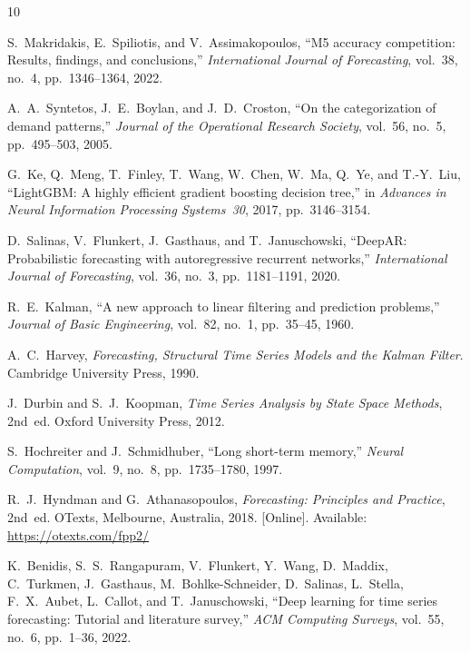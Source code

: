 \documentclass[conference]{IEEEtran}
\begin{document}
\begin{thebibliography}{10}

S.~Makridakis, E.~Spiliotis, and V.~Assimakopoulos,
``M5 accuracy competition: Results, findings, and conclusions,''
\textit{International Journal of Forecasting}, vol.~38, no.~4, pp.~1346--1364, 2022.

A.~A.~Syntetos, J.~E.~Boylan, and J.~D.~Croston,
``On the categorization of demand patterns,''
\textit{Journal of the Operational Research Society}, vol.~56, no.~5, pp.~495--503, 2005.

G.~Ke, Q.~Meng, T.~Finley, T.~Wang, W.~Chen, W.~Ma, Q.~Ye, and T.-Y.~Liu,
``LightGBM: A highly efficient gradient boosting decision tree,''
in \textit{Advances in Neural Information Processing Systems~30}, 2017, pp.~3146--3154.

D.~Salinas, V.~Flunkert, J.~Gasthaus, and T.~Januschowski,
``DeepAR: Probabilistic forecasting with autoregressive recurrent networks,''
\textit{International Journal of Forecasting}, vol.~36, no.~3, pp.~1181--1191, 2020.

R.~E.~Kalman,
``A new approach to linear filtering and prediction problems,''
\textit{Journal of Basic Engineering}, vol.~82, no.~1, pp.~35--45, 1960.

A.~C.~Harvey,
\textit{Forecasting, Structural Time Series Models and the Kalman Filter}.
Cambridge University Press, 1990.

J.~Durbin and S.~J.~Koopman,
\textit{Time Series Analysis by State Space Methods}, 2nd~ed.
Oxford University Press, 2012.

S.~Hochreiter and J.~Schmidhuber,
``Long short-term memory,''
\textit{Neural Computation}, vol.~9, no.~8, pp.~1735--1780, 1997.

R.~J.~Hyndman and G.~Athanasopoulos,
\textit{Forecasting: Principles and Practice}, 2nd~ed.
OTexts, Melbourne, Australia, 2018.
[Online]. Available: \url{https://otexts.com/fpp2/}

K.~Benidis, S.~S.~Rangapuram, V.~Flunkert, Y.~Wang, D.~Maddix, C.~Turkmen, J.~Gasthaus, M.~Bohlke-Schneider, D.~Salinas, L.~Stella, F.~X.~Aubet, L.~Callot, and T.~Januschowski,
``Deep learning for time series forecasting: Tutorial and literature survey,''
\textit{ACM Computing Surveys}, vol.~55, no.~6, pp.~1--36, 2022.

\end{thebibliography}
\end{document}
